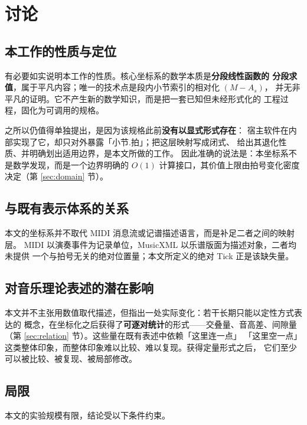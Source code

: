 \documentclass[11pt,a4paper,fontset=none]{ctexart}
\begin{document}
\section{讨论}
\label{sec:disc}

\subsection{本工作的性质与定位}

有必要如实说明本工作的性质。核心坐标系的数学本质是\textbf{分段线性函数的
分段求值}，属于平凡内容；唯一的技术点是段内小节索引的相对化 $(M-A_s)$，
并无非平凡的证明。它不产生新的数学知识，而是把一套已知但未经形式化的
工程过程，固化为可调用的规格。

之所以仍值得单独提出，是因为该规格此前\textbf{没有以显式形式存在}：
宿主软件在内部实现了它，却只对外暴露「小节.拍」；把这层映射写成闭式、
给出其退化性质、并明确划出适用边界，是本文所做的工作。
因此准确的说法是：本坐标系不是数学发现，而是一个边界明确的 $O(1)$
计算接口，其价值上限由拍号变化密度决定（第 \ref{sec:domain} 节）。

\subsection{与既有表示体系的关系}

本文的坐标系并不取代 MIDI 消息流或记谱描述语言，而是补足二者之间的映射层。
MIDI 以演奏事件为记录单位，MusicXML 以乐谱版面为描述对象，二者均未提供
一个与拍号无关的绝对位置量；本文所定义的绝对 Tick 正是该缺失量。

\subsection{对音乐理论表述的潜在影响}

本文并不主张用数值取代描述，但指出一处实际变化：若干长期只能以定性方式表达的
概念，在坐标化之后获得了\textbf{可逐对统计}的形式——交叠量、音高差、间隙量
（第 \ref{sec:relation} 节）。这些量在既有表述中依赖「这里连一点」
「这里空一点」这类整体印象，而整体印象难以比较、难以复现。获得定量形式之后，
它们至少可以被比较、被复现、被局部修改。

\subsection{局限}

本文的实验规模有限，结论受以下条件约束。
\end{document}
